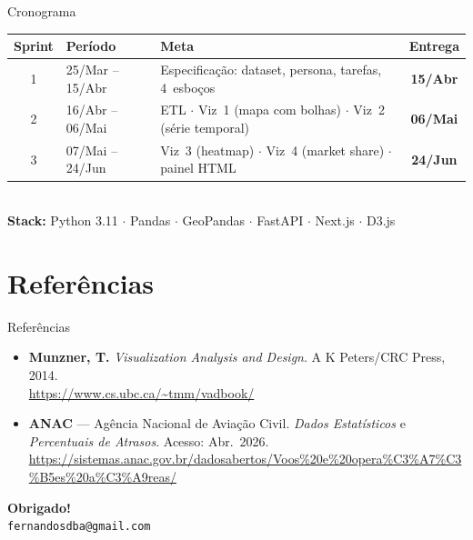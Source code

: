 \documentclass[aspectratio=169]{beamer}
\begin{document}
\begin{frame}[t]{Cronograma}
  \footnotesize
  \begin{tabularx}{\textwidth}{@{} c l X c @{}}
    \toprule
    \textbf{Sprint} & \textbf{Período} & \textbf{Meta} & \textbf{Entrega} \\
    \midrule
    \rowcolor{lightgray}
    1 & 25/Mar -- 15/Abr
      & Especificação: dataset, persona, tarefas, 4~esboços
      & \textbf{15/Abr} \\
    2 & 16/Abr -- 06/Mai
      & ETL $\cdot$ Viz~1 (mapa com bolhas) $\cdot$ Viz~2 (série temporal)
      & \textbf{06/Mai} \\
    \rowcolor{lightgray}
    3 & 07/Mai -- 24/Jun
      & Viz~3 (heatmap) $\cdot$ Viz~4 (market share) $\cdot$ painel HTML
      & \textbf{24/Jun} \\
    \bottomrule
  \end{tabularx}
  \medskip\\
  \small\textbf{Stack:} Python 3.11 $\cdot$ Pandas $\cdot$ GeoPandas $\cdot$
  FastAPI $\cdot$ Next.js $\cdot$ D3.js
\end{frame}

\section{Referências}

\begin{frame}[t]{Referências}
  \footnotesize
  \begin{itemize}\setlength{\itemsep}{12pt}
    \item \textbf{Munzner, T.}
          \textit{Visualization Analysis and Design}.
          A K Peters/CRC Press, 2014.\\
          {\scriptsize\url{https://www.cs.ubc.ca/~tmm/vadbook/}}

    \item \textbf{ANAC} --- Agência Nacional de Aviação Civil.
          \textit{Dados Estatísticos} e \textit{Percentuais de Atrasos}.
          Acesso: Abr.\ 2026.\\
          {\scriptsize\url{https://sistemas.anac.gov.br/dadosabertos/Voos\%20e\%20opera\%C3\%A7\%C3\%B5es\%20a\%C3\%A9reas/}}
  \end{itemize}
\end{frame}

\begin{frame}[c]{}
  \centering
  {\LARGE\textbf{Obrigado!}}\\[10pt]
  \small\texttt{fernandosdba@gmail.com}
\end{frame}
\end{document}
